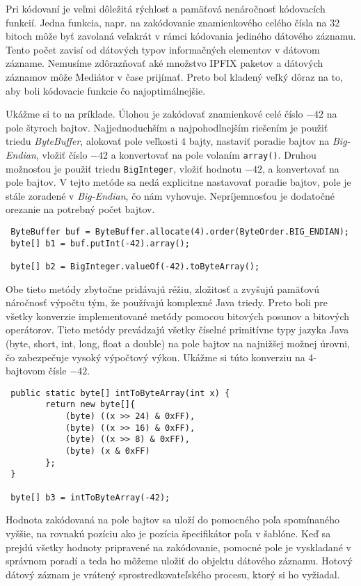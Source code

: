 Pri kódovaní je veľmi dôležitá rýchlosť a pamäťová 
nenáročnosť kódovacích funkcií. Jedna funkcia, napr. na zakódovanie znamienkového celého čísla na 32
bitoch môže byť zavolaná veľakrát v rámci kódovania jediného dátového záznamu. Tento počet zavisí od 
dátových typov informačných elementov v dátovom zázname. Nemusíme zdôrazňovať aké množstvo IPFIX paketov 
a dátových záznamov môže Mediátor v čase prijímať. Preto bol kladený veľký dôraz na to, aby boli 
kódovacie funkcie čo najoptimálnejšie. 

Ukážme si to na príklade. Úlohou je zakódovať znamienkové celé číslo $-42$ na pole štyroch bajtov.
Najjednoduchším a najpohodlnejším riešením je použiť triedu \emph{ByteBuffer}, alokovať pole veľkosti 
$4$ bajty, nastaviť poradie bajtov na \emph{Big-Endian}, vložiť číslo $-42$ a konvertovať na pole 
volaním \verb|array()|. Druhou možnosťou je použiť triedu \verb|BigInteger|, vložiť hodnotu $-42$, 
a konvertovať na pole bajtov. V tejto metóde sa nedá explicitne nastavovať poradie bajtov, pole 
je stále zoradené v \emph{Big-Endian}, čo nám vyhovuje. Nepríjemnosťou je dodatočné orezanie na 
potrebný počet bajtov. 
\begin{verbatim}
 ByteBuffer buf = ByteBuffer.allocate(4).order(ByteOrder.BIG_ENDIAN);
 byte[] b1 = buf.putInt(-42).array();
 
 byte[] b2 = BigInteger.valueOf(-42).toByteArray();
\end{verbatim}
Obe tieto metódy zbytočne pridávajú réžiu, zložitosť a zvyšujú pamäťovú náročnosť výpočtu tým, že 
používajú komplexné Java triedy. Preto boli pre všetky konverzie implementované metódy pomocou bitových
posunov a bitových operátorov. Tieto metódy prevádzajú všetky číselné primitívne typy jazyka Java 
(byte, short, int, long, float a double) na pole bajtov na najnižšej možnej úrovni, čo zabezpečuje vysoký
výpočtový výkon. Ukážme si túto konverziu na 4-bajtovom čísle $-42$.
\begin{verbatim}
 public static byte[] intToByteArray(int x) {
        return new byte[]{
            (byte) ((x >> 24) & 0xFF),
            (byte) ((x >> 16) & 0xFF),
            (byte) ((x >> 8) & 0xFF),
            (byte) (x & 0xFF)
        };
 }
 
 byte[] b3 = intToByteArray(-42);
\end{verbatim}

Hodnota zakódovaná na pole bajtov sa uloží do pomocného poľa spomínaného vyššie, na rovnakú pozíciu
ako je pozícia špecifikátor poľa v šablóne. Keď sa prejdú všetky hodnoty pripravené na zakódovanie, 
pomocné pole je vyskladané v správnom poradí a teda ho môžeme uložiť do objektu dátového záznamu.
Hotový dátový záznam je vrátený sprostredkovateľského procesu, ktorý si ho vyžiadal.



